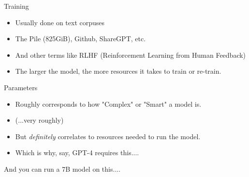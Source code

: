 \documentclass{beamer}
\begin{document}
\begin{frame}{Training}
	\begin{itemize}
		\item Usually done on text corpuses
		\pause
		\item The Pile (825GiB), Github, ShareGPT, etc.
		\pause
		\item And other terms like RLHF (Reinforcement Learning from Human Feedback)
		\pause
		\item The larger the model, the more resources it takes to train or re-train.
	\end{itemize}
\end{frame}

\begin{frame}{Parameters}
	\begin{itemize}
		\item Roughly corresponds to how "Complex" or "Smart" a model is.
		\pause
		\item (...very roughly)
		\pause 
		\item But \textit{definitely} correlates to resources needed to run the model.
		\pause
		\item Which is why, say, GPT-4 requires this....
	\end{itemize}
\end{frame}



\begin{frame}[plain]
\end{frame}

\begin{frame}
	And you can run a 7B model on this....
\end{frame}
\end{document}
